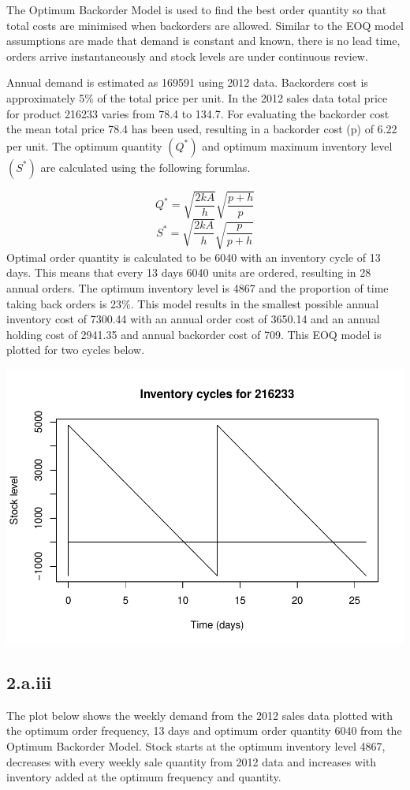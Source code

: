 \documentclass[
  11pt,
]{article}
\begin{document}
The Optimum Backorder Model is used to find the best order quantity so
that total costs are minimised when backorders are allowed. Similar to
the EOQ model assumptions are made that demand is constant and known,
there is no lead time, orders arrive instantaneously and stock levels
are under continuous review.

Annual demand is estimated as 169591 using 2012 data. Backorders cost is
approximately 5\% of the total price per unit. In the 2012 sales data
total price for product 216233 varies from 78.4 to 134.7. For evaluating
the backorder cost the mean total price 78.4 has been used, resulting in
a backorder cost (p) of 6.22 per unit. The optimum quantity \((Q^*)\)
and optimum maximum inventory level \((S^*)\) are calculated using the
following forumlas.

\[Q^* = \sqrt{\frac{2kA}{h}} \sqrt{\frac{p+h}{p}} \]
\[S^* = \sqrt{\frac{2kA}{h}} \sqrt{\frac{p}{p+h}} \] Optimal order
quantity is calculated to be 6040 with an inventory cycle of 13 days.
This means that every 13 days 6040 units are ordered, resulting in 28
annual orders. The optimum inventory level is 4867 and the proportion of
time taking back orders is 23\%. This model results in the smallest
possible annual inventory cost of 7300.44 with an annual order cost of
3650.14 and an annual holding cost of 2941.35 and annual backorder cost
of 709. This EOQ model is plotted for two cycles below.

\includegraphics[width=0.75\linewidth]{Assignment-STAT702---final_files/figure-latex/2aii plot-1}

\hypertarget{a.iii}{%
\subsection{2.a.iii}\label{a.iii}}

The plot below shows the weekly demand from the 2012 sales data plotted
with the optimum order frequency, 13 days and optimum order quantity
6040 from the Optimum Backorder Model. Stock starts at the optimum
inventory level 4867, decreases with every weekly sale quantity from
2012 data and increases with inventory added at the optimum frequency
and quantity.
\end{document}
